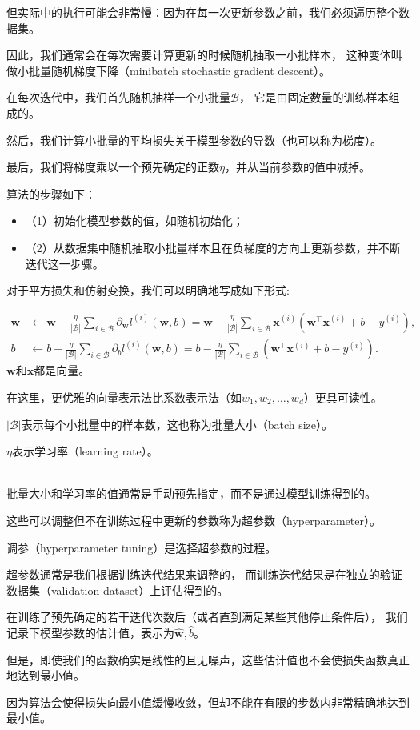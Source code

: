 \documentclass[openany,11pt]{book}
\begin{document}
但实际中的执行可能会非常慢：因为在每一次更新参数之前，我们必须遍历整个数据集。

因此，我们通常会在每次需要计算更新的时候随机抽取一小批样本，
这种变体叫做小批量随机梯度下降（minibatch stochastic gradient descent）。

在每次迭代中，我们首先随机抽样一个小批量$\mathcal{B}$，
它是由固定数量的训练样本组成的。

然后，我们计算小批量的平均损失关于模型参数的导数（也可以称为梯度）。

最后，我们将梯度乘以一个预先确定的正数$\eta$，并从当前参数的值中减掉。

算法的步骤如下：
\begin{itemize}
	\item （1）初始化模型参数的值，如随机初始化；
	\item （2）从数据集中随机抽取小批量样本且在负梯度的方向上更新参数，并不断迭代这一步骤。
\end{itemize}
对于平方损失和仿射变换，我们可以明确地写成如下形式:

$$\begin{aligned} \mathbf{w} &\leftarrow \mathbf{w} -   \frac{\eta}{|\mathcal{B}|} \sum_{i \in \mathcal{B}} \partial_{\mathbf{w}} l^{(i)}(\mathbf{w}, b) = \mathbf{w} - \frac{\eta}{|\mathcal{B}|} \sum_{i \in \mathcal{B}} \mathbf{x}^{(i)} \left(\mathbf{w}^\top \mathbf{x}^{(i)} + b - y^{(i)}\right),\\ b &\leftarrow b -  \frac{\eta}{|\mathcal{B}|} \sum_{i \in \mathcal{B}} \partial_b l^{(i)}(\mathbf{w}, b)  = b - \frac{\eta}{|\mathcal{B}|} \sum_{i \in \mathcal{B}} \left(\mathbf{w}^\top \mathbf{x}^{(i)} + b - y^{(i)}\right). \end{aligned}$$
$\mathbf{w}$和$\mathbf{x}$都是向量。

在这里，更优雅的向量表示法比系数表示法（如$w_1, w_2, \ldots, w_d$）更具可读性。

$|\mathcal{B}|$表示每个小批量中的样本数，这也称为批量大小（batch size）。

$\eta$表示学习率（learning rate）。


~\\
批量大小和学习率的值通常是手动预先指定，而不是通过模型训练得到的。

这些可以调整但不在训练过程中更新的参数称为超参数（hyperparameter）。

调参（hyperparameter tuning）是选择超参数的过程。

超参数通常是我们根据训练迭代结果来调整的，
而训练迭代结果是在独立的验证数据集（validation dataset）上评估得到的。

在训练了预先确定的若干迭代次数后（或者直到满足某些其他停止条件后），
我们记录下模型参数的估计值，表示为$\hat{\mathbf{w}}, \hat{b}$。

但是，即使我们的函数确实是线性的且无噪声，这些估计值也不会使损失函数真正地达到最小值。

因为算法会使得损失向最小值缓慢收敛，但却不能在有限的步数内非常精确地达到最小值。
\end{document}
